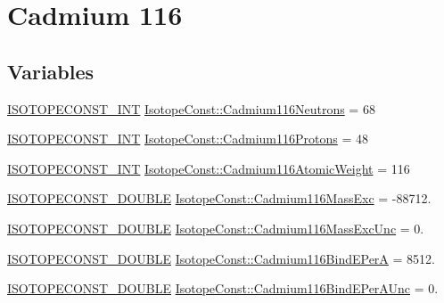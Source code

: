 \hypertarget{group___isotope_const-_cadmium-_cd116}{}\section{Cadmium 116}
\label{group___isotope_const-_cadmium-_cd116}
\subsection*{Variables}
\begin{DoxyCompactItemize}
\item 
\mbox{\hyperlink{group___isotope_const-_macros_ga5f18360b3e99483a35c32d789e62621c}{I\+S\+O\+T\+O\+P\+E\+C\+O\+N\+S\+T\+\_\+\+I\+NT}} \mbox{\hyperlink{group___isotope_const-_cadmium-_cd116_gadd4fe12d4dc308a3c40198b739709547}{Isotope\+Const\+::\+Cadmium116\+Neutrons}} = 68
\item 
\mbox{\hyperlink{group___isotope_const-_macros_ga5f18360b3e99483a35c32d789e62621c}{I\+S\+O\+T\+O\+P\+E\+C\+O\+N\+S\+T\+\_\+\+I\+NT}} \mbox{\hyperlink{group___isotope_const-_cadmium-_cd116_ga6f231a8a9b732dc2e8c36a53f1b8a3ff}{Isotope\+Const\+::\+Cadmium116\+Protons}} = 48
\item 
\mbox{\hyperlink{group___isotope_const-_macros_ga5f18360b3e99483a35c32d789e62621c}{I\+S\+O\+T\+O\+P\+E\+C\+O\+N\+S\+T\+\_\+\+I\+NT}} \mbox{\hyperlink{group___isotope_const-_cadmium-_cd116_gaa5201dcca150dfeb352f8985d5baba69}{Isotope\+Const\+::\+Cadmium116\+Atomic\+Weight}} = 116
\item 
\mbox{\hyperlink{group___isotope_const-_macros_ga8f45a7272ce02c0b4c65c44636ed719a}{I\+S\+O\+T\+O\+P\+E\+C\+O\+N\+S\+T\+\_\+\+D\+O\+U\+B\+LE}} \mbox{\hyperlink{group___isotope_const-_cadmium-_cd116_gaf352a6a25f2486ade85c3718349f1d13}{Isotope\+Const\+::\+Cadmium116\+Mass\+Exc}} = -\/88712.
\item 
\mbox{\hyperlink{group___isotope_const-_macros_ga8f45a7272ce02c0b4c65c44636ed719a}{I\+S\+O\+T\+O\+P\+E\+C\+O\+N\+S\+T\+\_\+\+D\+O\+U\+B\+LE}} \mbox{\hyperlink{group___isotope_const-_cadmium-_cd116_ga1d8df3306224376efc6a314f177e30d8}{Isotope\+Const\+::\+Cadmium116\+Mass\+Exc\+Unc}} = 0.
\item 
\mbox{\hyperlink{group___isotope_const-_macros_ga8f45a7272ce02c0b4c65c44636ed719a}{I\+S\+O\+T\+O\+P\+E\+C\+O\+N\+S\+T\+\_\+\+D\+O\+U\+B\+LE}} \mbox{\hyperlink{group___isotope_const-_cadmium-_cd116_gaa42de61950e45b490cc7959102a871ad}{Isotope\+Const\+::\+Cadmium116\+Bind\+E\+PerA}} = 8512.
\item 
\mbox{\hyperlink{group___isotope_const-_macros_ga8f45a7272ce02c0b4c65c44636ed719a}{I\+S\+O\+T\+O\+P\+E\+C\+O\+N\+S\+T\+\_\+\+D\+O\+U\+B\+LE}} \mbox{\hyperlink{group___isotope_const-_cadmium-_cd116_ga66d4f940c5fb9b9e768acf0030da7253}{Isotope\+Const\+::\+Cadmium116\+Bind\+E\+Per\+A\+Unc}} = 0.

\end{DoxyCompactItemize}
